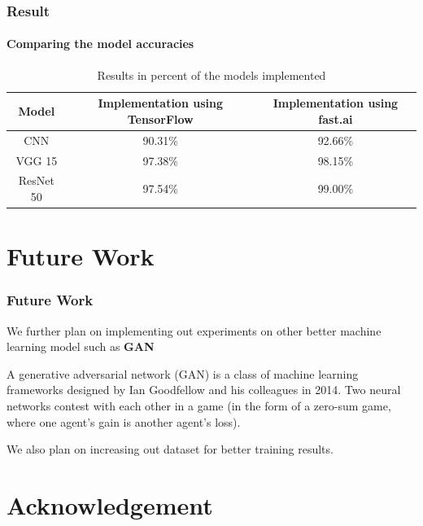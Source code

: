 \documentclass[10pt, aspectratio=169]{beamer}
\begin{document}
	\begin{frame}
		\frametitle{Result}
		\framesubtitle{Comparing the model accuracies}

		\begin{table}
			\begin{center}
				\begin{tabular}{| c | c | c |}
					\hline
					Model & Implementation using TensorFlow & Implementation using
					fast.ai \\
					\hline
					CNN & 90.31\% & 92.66\% \\
					\hline
					VGG 15 & 97.38\% & 98.15\% \\
					\hline
					ResNet 50 & 97.54\% & 99.00\% \\
					\hline
				\end{tabular}
				\caption{Results in percent of the models implemented}
			\end{center}
	\end{table}
	\end{frame}

	\section{Future Work}
	\begin{frame}
		\frametitle{Future Work}

		We further plan on implementing out experiments on other better machine
		learning model such as \textbf{GAN}

		\vspace{0.5cm}

		A generative adversarial network (GAN) is a class of machine learning
		frameworks designed by Ian Goodfellow and his colleagues in 2014. Two
		neural networks contest with each other in a game (in the form of a
		zero-sum game, where one agent's gain is another agent's loss).

		\vspace{0.5cm}

		We also plan on increasing out dataset for better training results.
	\end{frame}

	\section{Acknowledgement}
\end{document}
